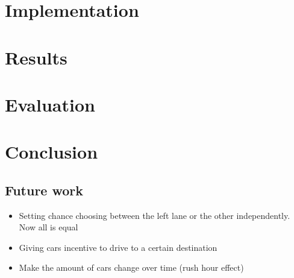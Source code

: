 \documentclass[a4paper,11pt]{article}
\begin{document}
\section{Implementation}\label{sec:implementation}

\section{Results}\label{sec:results}

\section{Evaluation}\label{sec:eval}

\section{Conclusion}\label{sec:conclusion}


\subsection{Future work}

\begin{itemize}
 \item Setting chance choosing between the left lane or the other independently. Now all is equal %
 \item Giving cars incentive to drive to a certain destination
 \item Make the amount of cars change over time (rush hour effect)
\end{itemize}





\end{document}
